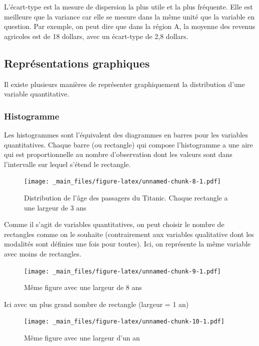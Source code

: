 \documentclass[
]{book}
\begin{document}
L'écart-type est la mesure de dispersion la plus utile et la plus fréquente. Elle est meilleure que la variance car elle se mesure dans la même unité que la variable en question. Par exemple, on peut dire que dans la région A, la moyenne des revenus agricoles est de 18 dollars, avec un écart-type de 2,8 dollars.

\hypertarget{repruxe9sentations-graphiques}{%
\subsection{Représentations graphiques}\label{repruxe9sentations-graphiques}}

Il existe plusieurs manières de représenter graphiquement la distribution d'une variable quantitative.

\hypertarget{histogramme}{%
\subsubsection{Histogramme}\label{histogramme}}

Les histogrammes sont l'équivalent des diagrammes en barres pour les variables quantitatives. Chaque barre (ou rectangle) qui compose l'histogramme a une aire qui est proportionnelle au nombre d'observation dont les valeurs sont dans l'intervalle sur lequel s'étend le rectangle.

\begin{figure}
\centering
\texttt{[image: \_main\_files/figure-latex/unnamed-chunk-8-1.pdf]}
\caption{\label{fig:unnamed-chunk-8}Distribution de l'âge des passagers du Titanic. Chaque rectangle a une largeur de 3 ans}
\end{figure}

Comme il s'agit de variables quantitatives, on peut choisir le nombre de rectangles comme on le souhaite (contrairement aux variables qualitative dont les modalités sont définies une fois pour toutes). Ici, on représente la même variable avec moins de rectangles.

\begin{figure}
\centering
\texttt{[image: \_main\_files/figure-latex/unnamed-chunk-9-1.pdf]}
\caption{\label{fig:unnamed-chunk-9}Même figure avec une largeur de 8 ans}
\end{figure}

Ici avec un plus grand nombre de rectangle (largeur = 1 an)

\begin{figure}
\centering
\texttt{[image: \_main\_files/figure-latex/unnamed-chunk-10-1.pdf]}
\caption{\label{fig:unnamed-chunk-10}Même figure avec une largeur d'un an}
\end{figure}
\end{document}
